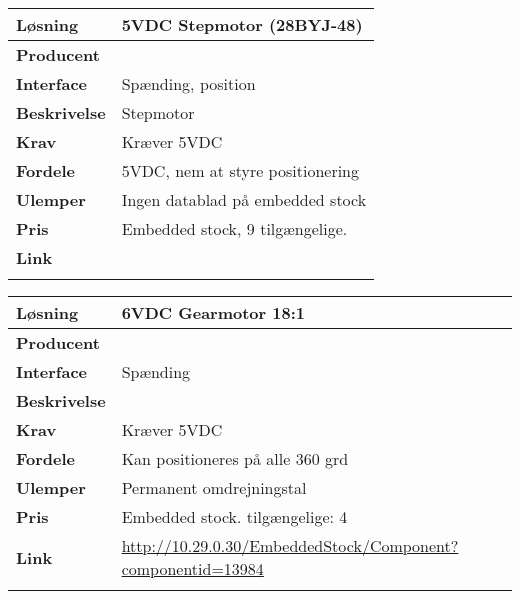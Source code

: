 \begin{table}[H] \centering
\begin{tabular}{|p{3cm}|p{11cm}|}
	\hline
	\textbf{Løsning}		
	    & 5VDC Stepmotor (28BYJ-48)
	\\ \hline
	\textbf{Producent} 		
	    & 
	\\ \hline
	\textbf{Interface} 		
	    & Spænding, position
	\\ \hline
	\textbf{Beskrivelse} 	
	    & Stepmotor
	\\ \hline
	\textbf{Krav} 			
	    & Kræver 5VDC
	\\ \hline
	\textbf{Fordele}		
	    & 5VDC, nem at styre positionering
	\\ \hline
	\textbf{Ulemper} 		
	    & Ingen datablad på embedded stock
	\\ \hline
	\textbf{Pris} 			
	    & Embedded stock, 9 tilgængelige.
	\\ \hline
	\textbf{Link} 			
	    & \url{}
	\\ \hline
	\multicolumn{2}{|c|}{} 
    \\ \hline
\end{tabular}
\end{table}

\begin{table}[H] \centering
\begin{tabular}{|p{3cm}|p{11cm}|}
	\hline
	\textbf{Løsning}		
	    & 6VDC Gearmotor 18:1
	\\ \hline
	\textbf{Producent} 		
	    & 
	\\ \hline
	\textbf{Interface} 		
	    & Spænding
	\\ \hline
	\textbf{Beskrivelse} 	
	    & 
	\\ \hline
	\textbf{Krav} 			
	    & Kræver 5VDC
	\\ \hline
	\textbf{Fordele}		
	    & Kan positioneres på alle 360 grd
	\\ \hline
	\textbf{Ulemper} 		
	    & Permanent omdrejningstal
	\\ \hline
	\textbf{Pris} 			
	    & Embedded stock. tilgængelige: 4
	\\ \hline
	\textbf{Link} 			
	    & \url{http://10.29.0.30/EmbeddedStock/Component?componentid=13984}
	\\ \hline
	\multicolumn{2}{|c|}{} 
    \\ \hline
\end{tabular}
\end{table}

